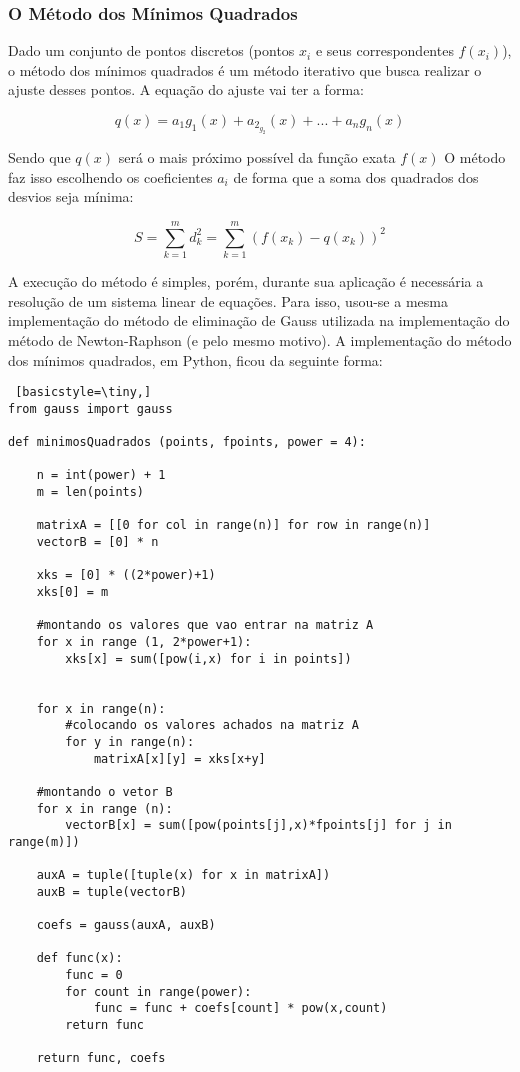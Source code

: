\documentclass[12pt,A4]{report}
\begin{document}
\subsubsection{O Método dos Mínimos Quadrados}
Dado um conjunto de pontos discretos (pontos $x_i$ e seus correspondentes $f(x_i)$), o método dos mínimos quadrados é um método iterativo que busca realizar o ajuste desses pontos. A equação do ajuste vai ter a forma:

\begin{equation}
    q(x) = a_1g_1(x) + a_2_g_2(x) + ... + a_ng_n(x)
\end{equation}

Sendo que $q(x)$ será o mais próximo possível da função exata $f(x)$ O método faz isso escolhendo os coeficientes $a_i$ de forma que a soma dos quadrados dos desvios seja mínima:

\begin{equation}
    S = \sum_{k=1}^{m} d_k^2 = \sum_{k=1}^{m} (f(x_k) - q(x_k))^2
\end{equation}

A execução do método é simples, porém, durante sua aplicação é necessária a resolução de um sistema linear de equações. Para isso, usou-se a mesma implementação do método de eliminação de Gauss utilizada na implementação do método de Newton-Raphson (e pelo mesmo motivo). A implementação do método dos mínimos quadrados, em Python, ficou da seguinte forma:

\begin{lstlisting} [basicstyle=\tiny,]
from gauss import gauss

def minimosQuadrados (points, fpoints, power = 4):
    
    n = int(power) + 1
    m = len(points)
    
    matrixA = [[0 for col in range(n)] for row in range(n)]    
    vectorB = [0] * n
    
    xks = [0] * ((2*power)+1)
    xks[0] = m
    
    #montando os valores que vao entrar na matriz A
    for x in range (1, 2*power+1):
        xks[x] = sum([pow(i,x) for i in points])
        
        
    for x in range(n):
        #colocando os valores achados na matriz A
        for y in range(n): 
            matrixA[x][y] = xks[x+y]
           
    #montando o vetor B
    for x in range (n):
        vectorB[x] = sum([pow(points[j],x)*fpoints[j] for j in range(m)]) 
        
    auxA = tuple([tuple(x) for x in matrixA])
    auxB = tuple(vectorB)
    
    coefs = gauss(auxA, auxB)
    
    def func(x):
        func = 0
        for count in range(power):
            func = func + coefs[count] * pow(x,count)
        return func
    
    return func, coefs
\end{lstlisting}
\end{document}
